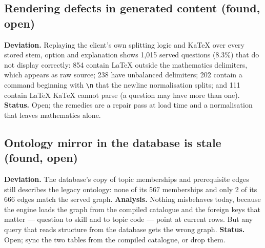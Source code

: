 \subsection{Rendering defects in generated content (found, open)}
\label{sec:revisions-render}

\textbf{Deviation.} Replaying the client's own splitting logic and KaTeX over
every stored stem, option and explanation shows 1{,}015 served questions (8.3\%)
that do not display correctly: 854 contain \LaTeX{} outside the mathematics
delimiters, which appears as raw source; 238 have unbalanced delimiters; 202
contain a command beginning with \verb|\n| that the newline normalisation splits;
and 111 contain \LaTeX{} KaTeX cannot parse (a question may have more than one).
\textbf{Status.} Open; the remedies are a repair pass at load time and a
normalisation that leaves mathematics alone.

\subsection{Ontology mirror in the database is stale (found, open)}
\label{sec:revisions-mirror}

\textbf{Deviation.} The database's copy of topic memberships and prerequisite
edges still describes the legacy ontology: none of its 567 memberships and only 2
of its 666 edges match the served graph. \textbf{Analysis.} Nothing misbehaves
today, because the engine loads the graph from the compiled catalogue and the
foreign keys that matter --- question to skill and to topic code --- point at
current rows. But any query that reads structure from the database gets the
wrong graph. \textbf{Status.} Open; sync the two tables from the compiled
catalogue, or drop them.
